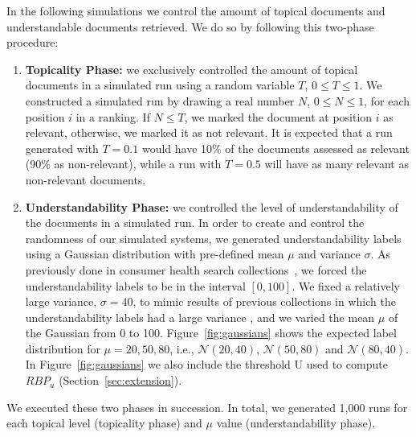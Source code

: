 In the following simulations we control the amount of topical documents and understandable documents retrieved. We do so by following this two-phase procedure:

\begin{enumerate}
\item \textbf{Topicality Phase:} we exclusively controlled the amount of topical documents in a simulated run using a random variable $T$, $0 \le T \le 1$. 
We constructed a simulated run by drawing a real number $N$, $0 \le N \le 1$, for each position $i$ in a ranking. If $N \le T$, we marked the document at position $i$ as relevant, otherwise, we marked it as not relevant. It is expected that a run generated with $T=0.1$ would have 10\% of the documents assessed as relevant (90\% as non-relevant), while a run with $T=0.5$ will have as many relevant as non-relevant documents. 

\item \textbf{Understandability Phase:}  we controlled the level of understandability of the documents in a simulated run. In order to create and control the randomness of our simulated systems, we generated understandability labels using a Gaussian distribution with pre-defined mean $\mu$ and variance $\sigma$. 
As previously done in consumer health search collections~\cite{clefIR16,clefIR17}, we forced the understandability labels to be in the interval $[0,100]$. 
We fixed a relatively large variance, $\sigma=40$, to mimic results of previous collections in which the understandability labels had a large variance \cite{clefIR16}, and we varied the mean $\mu$ of the Gaussian from 0 to 100. Figure~\ref{fig:gaussians} shows the expected label distribution for $\mu=20, 50, 80$, i.e., $\mathcal{N}(20, 40)$, $\mathcal{N}(50, 80)$ and $\mathcal{N}(80, 40)$.
In Figure~\ref{fig:gaussians} we also include the threshold U used to compute $RBP_u$ (Section~\ref{sec:extension}).
\end{enumerate}

We executed these two phases in succession. In total, we generated 1,000 runs for each topical level (topicality phase) and $\mu$ value (understandability phase). 



